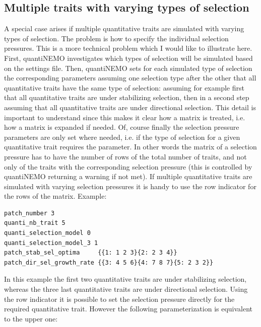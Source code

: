 \documentclass[letterpaper,12pt,oneside]{book}
\begin{document}
\clearpage
{}
{} 
\printindex

\begin{appendices}
\subsection{Multiple traits with varying types of selection}
A special case arises if multiple quantitative traits are simulated with varying types of selection. The problem is how to specify the individual selection pressures. This is a more technical problem which I would like to illustrate here. First, quantiNEMO investigates which types of selection will be simulated based on the settings file. Then, quantiNEMO sets for each simulated type of selection the corresponding parameters assuming one selection type after the other that all quantitative traits have the same type of selection: assuming for example first that all quantitative traits are under stabilizing selection, then in a second step assuming that all quantitative traits are under directional selection. This detail is important to understand since this makes it clear how a matrix is treated, i.e. how a matrix is expanded if needed. Of, course finally the selection pressure parameters are only set where needed, i.e. if the type of selection for a given quantitative trait requires the parameter. In other words the matrix of a selection pressure has to have the number of rows of the total number of traits, and not only of the traits with the corresponding selection pressure (this is controlled by quantiNEMO returning a warning if not met). If multiple quantitative traits are simulated with varying selection pressures it is handy to use the row indicator for the rows of the matrix. Example:
\begin{lstlisting}[frame=single]
patch_number 3
quanti_nb_trait 5 
quanti_selection_model 0	
quanti_selection_model_3 1
patch_stab_sel_optima     {{1: 1 2 3}{2: 2 3 4}}
patch_dir_sel_growth_rate {{3: 4 5 6}{4: 7 8 7}{5: 2 3 2}}
\end{lstlisting}
In this example the first two quantitative traits are under stabilizing selection, whereas the three last quantitative traits are under directional selection. Using the row indicator it is possible to set the selection pressure directly for the required quantitative trait. However the following parameterization is equivalent to the upper one:

\end{appendices}
\end{document}
